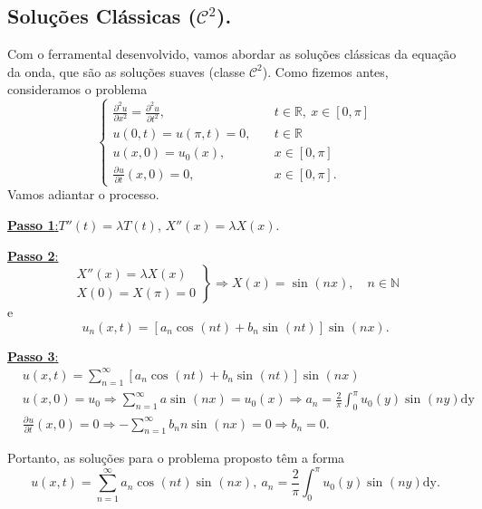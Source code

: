 \documentclass[../pde_notes.tex]{subfiles}
\begin{document}
\subsection{Soluções Clássicas (\(\mathcal{C}^{2}\)).}
Com o ferramental desenvolvido, vamos abordar as soluções clássicas da equação da onda, que são as soluções suaves (classe \(\mathcal{C}^{2}\)). Como fizemos antes, consideramos o problema
\[
	\left\{\begin{array}{ll}
		\frac{\partial^{2}u}{\partial x^{2}}=\frac{\partial^{2}u}{\partial t^{2}}, & \quad t\in \mathbb{R},\: x\in [0, \pi ] \\
		u(0, t)=u(\pi , t)=0,                                                      & \quad t\in \mathbb{R}                   \\
		u(x,0)=u_{0}(x),                                                           & \quad x\in [0,\pi ]                     \\
		\frac{\partial^{}u}{\partial t^{}}(x,0)=0,                                 & \quad x\in [0,\pi ].
	\end{array}\right.
\]
Vamos adiantar o processo.

\underline{\textbf{Passo 1}:}\(T''(t)=\lambda T(t)\), \(X''(x)=\lambda X(x).\)

\underline{\textbf{Passo 2}:}
\[
	\left.\begin{array}{ll}
		X''(x)=\lambda X(x) \\
		X(0)=X(\pi )=0
	\end{array}\right\} \Rightarrow X(x)=\sin^{}{(nx)},\quad n\in \mathbb{N}
\]
e
\[
	u_{n}(x, t)=[a_{n}\cos^{}{(nt)}+b_{n}\sin^{}{(nt)}]\sin^{}{(nx)}.
\]

\underline{\textbf{Passo 3}:}
\begin{align*}
	 & u(x, t)=\sum\limits_{n=1}^{\infty}[a_{n}\cos^{}{(nt)}+b_{n}\sin^{}{(nt)}]\sin^{}{(nx)}                                                                    \\
	 & u(x,0)=u_{0}\Rightarrow \sum\limits_{n=1}^{\infty}a\sin^{}{(nx)}=u_{0}(x)\Rightarrow a_{n}=\frac{2}{\pi }\int_{0}^{\pi }u_{0}(y)\sin^{}{(ny)} \mathrm{dy} \\
	 & \frac{\partial^{}u}{\partial t^{}}(x,0)=0 \Rightarrow -\sum\limits_{n=1}^{\infty}b_{n}n\sin^{}{(nx)}=0 \Rightarrow b_{n}=0.
\end{align*}

Portanto, as soluções para o problema proposto têm a forma
\[
	u(x,t)=\sum\limits_{n=1}^{\infty}a_{n}\cos^{}{(nt)}\sin^{}{(nx)},\: a_{n}=\frac{2}{\pi }\int_{0}^{\pi }u_{0}(y)\sin^{}{(ny)} \mathrm{dy}.
\]
\end{document}
